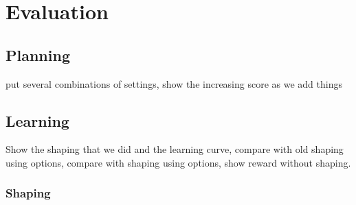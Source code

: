 \chapter{Evaluation}
\section{Planning\label{sec:score-planning}}
put several combinations of settings, show the increasing score as we add things
\section{Learning}
Show the shaping that we did and the learning curve, compare with old shaping
using options, compare with shaping using options, show reward without shaping.
\subsection{Shaping\label{subsec:evaluation-shaping}}


